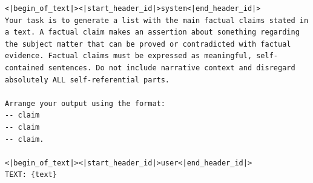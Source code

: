 \documentclass[11pt]{article}
\begin{document}
\begin{lstlisting}[breaklines=true, columns=flexible, basicstyle=\footnotesize]
<|begin_of_text|><|start_header_id|>system<|end_header_id|>
Your task is to generate a list with the main factual claims stated in a text. A factual claim makes an assertion about something regarding the subject matter that can be proved or contradicted with factual evidence. Factual claims must be expressed as meaningful, self-contained sentences. Do not include narrative context and disregard absolutely ALL self-referential parts.

Arrange your output using the format:
-- claim
-- claim
-- claim.

<|begin_of_text|><|start_header_id|>user<|end_header_id|>
TEXT: {text}
\end{lstlisting}
\end{document}
